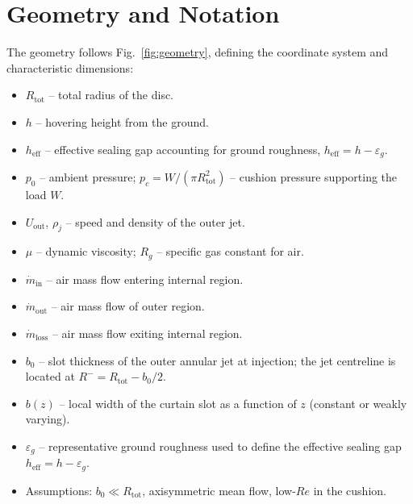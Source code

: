 \documentclass[11pt,a4paper]{article}
\begin{document}
\section{Geometry and Notation}
\label{sec:geometry}
The geometry follows Fig.~\ref{fig:geometry}, defining the coordinate system and characteristic dimensions:
\begin{itemize}
  \item $R_{\mathrm{tot}}$ -- total radius of the disc.
  \item $h$ -- hovering height from the ground.
  \item $h_{\mathrm{eff}}$ -- effective sealing gap accounting for ground roughness, $h_{\mathrm{eff}}=h-\varepsilon_g$.
  \item $p_0$ -- ambient pressure; $p_c=W/(\pi R_{\mathrm{tot}}^2)$ -- cushion pressure supporting the load $W$.
  \item $U_{\mathrm{out}}$, $\rho_j$ -- speed and density of the outer jet.
  \item $\mu$ -- dynamic viscosity; $R_g$ -- specific gas constant for air.
  \item $\dot{m}_{\mathrm{in}}$ -- air mass flow entering internal region.
  \item $\dot{m}_{\mathrm{out}}$ -- air mass flow of outer region.
  \item $\dot{m}_{\mathrm{loss}}$ -- air mass flow exiting internal region.
  \item $b_0$ -- slot thickness of the outer annular jet at injection; the jet centreline is located at $R^{-}=R_{\mathrm{tot}}-b_0/2$.
  \item $b(z)$ -- local width of the curtain slot as a function of $z$ (constant or weakly varying).
  \item $\varepsilon_g$ -- representative ground roughness used to define the effective sealing gap $h_{\mathrm{eff}} = h - \varepsilon_g$.
  \item Assumptions: $b_0\ll R_{\mathrm{tot}}$, axisymmetric mean flow, low-$Re$ in the cushion.
\end{itemize}
\end{document}

